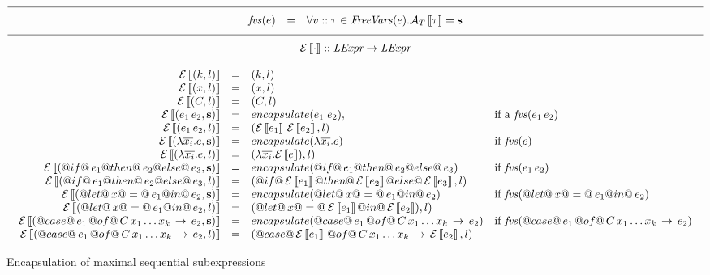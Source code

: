 \begin{figure*}
$$\begin{array}{c}
\hline \\[-2mm] 
\begin{array}{rcll}
  \fvs{e} &=& \forall v::\tau \in \mathit{FreeVars} (e). \AT{\tau} = \AVS
\end{array}
\\ \\[-2mm]
\hline \\[-2mm]
\mbox{$\Encaps\cdot :: \textit{LExpr} \to \textit{LExpr}$} \\ \\
\begin{array}{rcll}
   \Encaps{(k,l)} &=& (k, l) \\
   \Encaps{(x,l)} &=& (x, l) \\
   \Encaps{(C, l)}&=& (C, l) \\
   \Encaps{(e_1\, e_2, \AVS)} &=& encapsulate (e_1\;e_2), & \mbox{if a \fvs{e_1\,e_2}} \\
 \Encaps{(e_1\, e_2,  l)} &=& (\Encaps{e_1}\, \Encaps{e_2}, l) \\
 \Encaps{(\lambda{\tup{x_i}}.e, \AVS)} &=&  
       encapsulate (\lambda{\tup{x_i}}.e) &\mbox{if \fvs{e}} \\ 
  \Encaps{(\lambda{\tup{x_i}}.e, l)} &=&  
       (\lambda{\tup{x_i}}. \Encaps e), l)\\
\Encaps{(@if@\,e_1  @then@ \,e_2 @else@ \, e_3, \AVS)} &=&  
    encapsulate (@if@\,e_1  @then@ \,e_2 @else@ \, e_3)& \mbox{if  $\fvs{e_1\,e_2}$} \\
\Encaps{(@if@\,e_1  @then@ \,e_2 @else@ \, e_3, l)} &=&  
    (@if@\,\Encaps{e_1}  @then@ \,\Encaps{e_2} @else@ \, \Encaps{e_3}, l) \\
%
\Encaps{(@let@\, x @=@ \,e_1  @in@ \,e_2, \AVS)}   &=& 
    encapsulate (@let@\, x @=@ \,e_1  @in@ \,e_2) & \mbox{if  \fvs{@let@\, x @=@ \,e_1  @in@ \,e_2}} \\
\Encaps{(@let@\, x @=@ \,e_1  @in@ \,e_2, l)}   &=& 
    (@let@\, x @=@ \,\Encaps{e_1}  @in@ \,\Encaps{e_2}), l)\\
\Encaps{(@case@\,e_1 \, @of@ \,C\,x_1 \ldots x_k \, \rightarrow \,e_2, \AVS)} &=&
    encapsulate (@case@\,e_1 \, @of@ \,C\,x_1 \ldots x_k \, \rightarrow \,e_2) 
          & \mbox{if \fvs{@case@\,e_1 \, @of@ \,C\,x_1 \ldots x_k \, \rightarrow \,e_2}}\\
\Encaps{(@case@\,e_1 \, @of@ \,C\,x_1 \ldots x_k \, \rightarrow \,e_2, l)} &=&
(@case@\,\Encaps{e_1} \, @of@ \,C\,x_1 \ldots x_k \, \rightarrow \,\Encaps{e_2}, l) 
\end{array}
\end{array}$$
\caption{Encapsulation of maximal sequential subexpressions} 
\label{fig:encaps}
\end{figure*}
